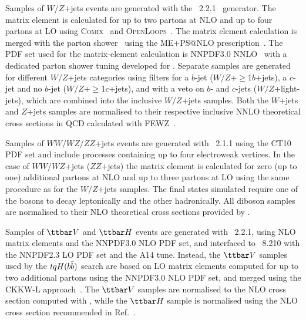Samples of $W/Z$+jets events are generated with the {\sherpa}~2.2.1~\cite{Gleisberg:2008ta} generator. 
The matrix element is calculated for up to two partons at NLO and up to four partons at LO using 
\textsc{Comix}~\cite{Gleisberg:2008fv} and \textsc{OpenLoops}~\cite{Cascioli:2011va}. The matrix element calculation 
is merged with the {\sherpa} parton shower~\cite{Schumann:2007mg} using the ME+PS@NLO prescription~\cite{Hoeche:2012yf}. 
The PDF set used for the matrix-element calculation is NNPDF3.0 NNLO~\cite{Ball:2014uwa} with a dedicated parton shower tuning developed for {\sherpa}. 
Separate samples are generated for different $W/Z$+jets categories using filters for a $b$-jet 
($W/Z$+$\geq$1$b$+jets), a $c$-jet and no $b$-jet ($W/Z$+$\geq$1$c$+jets), and with a veto on $b$- and $c$-jets 
($W/Z$+light-jets), which are combined into the inclusive $W/Z$+jets samples.
Both the $W$+jets and $Z$+jets samples are normalised to their respective inclusive NNLO theoretical 
cross sections in QCD calculated with \textsc{FEWZ}~\cite{Anastasiou:2003ds}.

Samples of $WW/WZ/ZZ$+jets events are generated with {\sherpa}~2.1.1 using the CT10 PDF set
and include processes containing up to four electroweak vertices. 
In the case of $WW/WZ$+jets ($ZZ$+jets) the matrix element is calculated for zero (up to one) additional partons 
at NLO and up to three partons at LO using the same procedure as for the $W/Z$+jets samples. 
The final states simulated require one of the bosons to decay leptonically and the other hadronically.
All diboson samples are normalised to their NLO theoretical cross sections provided by {\sherpa}. 

Samples of $\ttbar V$ and $\ttbar H$ events are generated with {\amcatnlo}~2.2.1, using NLO matrix elements and the NNPDF3.0 NLO PDF set,
and interfaced to {\pythia}~8.210 with the NNPDF2.3 LO PDF set and the A14 tune. 
Instead, the $\ttbar V$ samples used by the $tqH(b\bar{b})$ search are based on LO matrix elements computed for up to two additional partons 
using the NNPDF3.0 NLO PDF set, and merged using the CKKW-L approach~\cite{Lonnblad:2001iq}.
The $\ttbar V$ samples are normalised to the NLO cross section computed with {\amcatnlo}, while the $\ttbar H$ sample is normalised using 
the NLO cross section recommended in Ref.~\cite{deFlorian:2016spz}.


